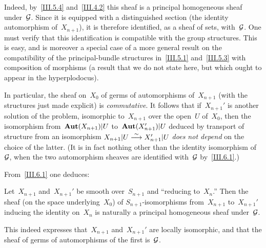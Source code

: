 Indeed, by~\ref{III.5.4} and~\ref{III.4.2} this sheaf is a principal homogeneous sheaf under~$\cal{G}$. Since it is equipped with a distinguished section (the identity automorphism of~$X_{n+1}$), it is therefore identified, as a sheaf of sets, with~$\cal{G}$. One must verify that this identification is compatible with the group structures. This is easy, and is moreover a special case of a more general result on the compatibility of the principal-bundle structures in~\ref{III.5.1} and~\ref{III.5.3} with composition of morphisms (a result that we do not state here, but which ought to appear in the hyperplodocus).

In particular, the sheaf on~$X_0$ of germs of automorphisms of~$X_{n+1}$ (with the structures just made explicit) is \emph{commutative}. It follows that if~$X_{n+1}'$ is another solution of the problem, isomorphic to~$X_{n+1}$ over the open~$U$ of~$X_0$, then the isomorphism from~$\SheafAut(X_{n+1})|U$ to~$\SheafAut(X_{n+1}')|U$ deduced by transport of structure from an isomorphism $X_{n+1}|U\isomto X_{n+1}'|U$ \emph{does not depend} on the choice of the latter. (It is in fact nothing other than the identity isomorphism of~$\cal{G}$, when the two automorphism sheaves are identified with~$\cal{G}$ by~\ref{III.6.1}.)

From~\ref{III.6.1} one deduces:

\begin{corollary}
\label{III.6.2}
Let~$X_{n+1}$ and~$X_{n+1}'$ be smooth over~$S_{n+1}$ and ``reducing to~$X_n$.'' Then the sheaf (on the space underlying~$X_0$) of $S_{n+1}$-isomorphisms from~$X_{n+1}$ to~$X_{n+1}'$ inducing the identity on~$X_n$ is naturally a principal homogeneous sheaf under~$\cal{G}$.
\end{corollary}

This indeed expresses that~$X_{n+1}$ and~$X_{n+1}'$ are locally isomorphic, and that the sheaf of germs of automorphisms of the first is~$\cal{G}$.


